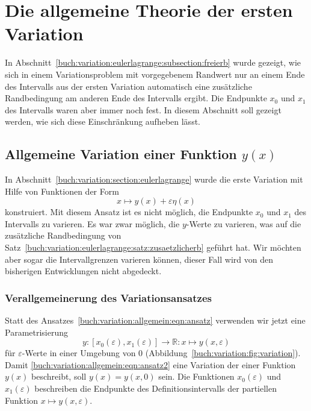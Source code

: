 %
%
%
\section{Die allgemeine Theorie der ersten Variation
\label{buch:variation:section:allgemein}}
In Abschnitt~\ref{buch:variation:eulerlagrange:subsection:freierb}
wurde gezeigt, wie sich in einem Variationsproblem mit vorgegebenem
Randwert nur an einem Ende des Intervalls aus der ersten Variation
automatisch eine zusätzliche Randbedingung am anderen Ende des
Intervalls ergibt.
Die Endpunkte $x_0$ und $x_1$ des Intervalls waren aber immer noch 
fest.
In diesem Abschnitt soll gezeigt werden, wie sich diese Einschränkung
aufheben lässt.

%
%
\subsection{Allgemeine Variation einer Funktion $y(x)$
\label{buch:variation:allgemein:subsection:vary}}
In Abschnitt~\ref{buch:variation:section:eulerlagrange} wurde die
erste Variation mit Hilfe von Funktionen der Form
\begin{equation}
x
\mapsto
y(x)+\varepsilon\eta(x)
\label{buch:variation:allgemein:eqn:ansatz}
\end{equation}
konstruiert.
Mit diesem Ansatz ist es nicht möglich, die Endpunkte $x_0$ und $x_1$
des Intervalls zu varieren.
Es war zwar möglich, die $y$-Werte zu varieren, was auf die zusätzliche
Randbedingung von
Satz~\ref{buch:variation:eulerlagrange:satz:zusaetzlicherb}
geführt hat.
Wir möchten aber sogar die Intervallgrenzen varieren können, dieser
Fall wird von den bisherigen Entwicklungen nicht abgedeckt.

%
%
\subsubsection{Verallgemeinerung des Variationsansatzes}
%
Statt des Ansatzes~\eqref{buch:variation:allgemein:eqn:ansatz}
verwenden wir jetzt eine Parametrisierung
\begin{equation}
y
\colon
[x_0(\varepsilon),x_1(\varepsilon)]
\to
\mathbb{R}
:
x\mapsto y(x,\varepsilon)
\label{buch:variation:allgemein:eqn:ansatz2}
\end{equation}
für $\varepsilon$-Werte in einer Umgebung von $0$
(Abbildung~\ref{buch:variation:fig:variation}).
Damit
\eqref{buch:variation:allgemein:eqn:ansatz2}
eine Variation der einer Funktion $y(x)$ beschreibt, soll
$y(x) = y(x,0)$ sein.
Die Funktionen $x_0(\varepsilon)$ und $x_1(\varepsilon)$ beschreiben
die Endpunkte des Definitionsintervalls der partiellen Funktion
$x\mapsto y(x,\varepsilon)$.

